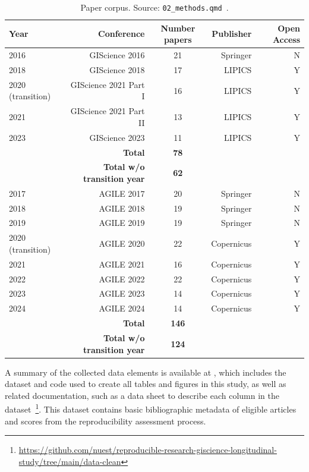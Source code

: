 \documentclass{josis}
\begin{document}
\begin{table}
\centering
\begin{tabular}{lrcrr}
\hline
Year & Conference & Number papers & Publisher & Open Access \\
\hline
2016 & GIScience 2016 &  21 & Springer & N  \\
2018 & GIScience  2018 &  17 & LIPICS & Y  \\ 
2020 (transition) & GIScience  2021 Part I &  16 & LIPICS & Y \\ 
2021 & GIScience  2021 Part II &  13 & LIPICS & Y  \\ 
2023 & GIScience  2023 &  11 & LIPICS & Y  \\ 
 & \textbf{Total} & \textbf{78}  &   \\
 & \textbf{Total w/o transition year} & \textbf{62} &    \\

\hline

2017 & AGILE 2017 & 20 & Springer & N \\ 
2018 & AGILE 2018 & 19 & Springer & N  \\
2019 & AGILE 2019 & 19 & Springer & N  \\
2020 (transition) & AGILE 2020 & 22 & Copernicus & Y  \\
2021 & AGILE 2021 & 16 & Copernicus & Y  \\
2022 & AGILE 2022 & 22 & Copernicus & Y  \\
2023 & AGILE 2023 & 14 & Copernicus & Y  \\
2024 & AGILE 2024 & 14 & Copernicus & Y  \\
 & \textbf{Total} &  \textbf{146} &   \\
 & \textbf{Total w/o transition year}  & \textbf{124} &  \\
\hline
\end{tabular}
\caption{Paper corpus. Source: \texttt{02\_methods.qmd}~\cite{data}.}
\label{tab:corpus}
\end{table}

A summary of the collected data elements is available at \cite{data}, which includes the dataset and code used to create all tables and figures in this study, as well as related documentation, such as a data sheet to describe each column in the dataset~\footnote{\url{https://github.com/nuest/reproducible-research-giscience-longitudinal-study/tree/main/data-clean}}. This dataset contains basic bibliographic metadata of eligible articles and scores from the reproducibility assessment process.
\end{document}
